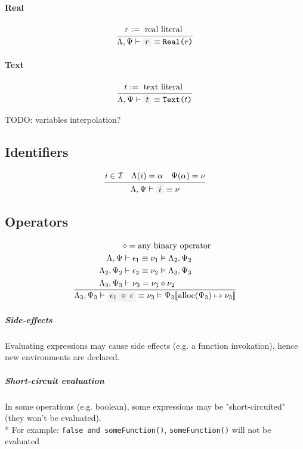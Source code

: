 \documentclass[11pt]{report}
\newcommand{\oprule}[3][gathered]{\frac{\begin{#1}#2\end{#1}}{\begin{gathered}#3\end{gathered}}}
\newcommand{\then}{\vdash}
\newcommand{\Then}{\vDash}
\newcommand{\code}[1]{\texttt{\colorbox{gray!10}{#1}}}
\newcommand{\bop}{\diamond}
\newcommand{\alloc}{\mathrm{alloc}}
\newcommand{\addr}{\alpha}
\newcommand{\expr}{\epsilon}
\newcommand{\val}{\nu}
\newcommand{\Id}{\mathcal{I}}
\newcommand{\env}[1]{[\![#1]\!]}
\newcommand{\EnvLoc}{\Lambda}
\newcommand{\EnvStore}{\Psi}
\theoremstyle{definition}
\newcommand{\comment}[1]{
	\parbox{0.9\linewidth}{\color{black!30}\small\sffamily #1}
}
\begin{document}
\paragraph{Real}

\[
	\oprule{
		r := \text{ real literal }
	}{
		\EnvLoc,\EnvStore\then \code{$r$} \equiv \texttt{Real($r$)}
	}
\]


\paragraph{Text}

\[
	\oprule{
		t := \text{ text literal }
	}{
		\EnvLoc,\EnvStore\then \code{$t$} \equiv \texttt{Text($t$)}
	}
\]

\comment{TODO: variables interpolation?}

\subsection{Identifiers}

\[
	\oprule{
		i \in \Id \quad \EnvLoc(i) = \addr \quad \EnvStore(\addr) = \val
	}{
		\EnvLoc,\EnvStore\then \code{$i$} \equiv \val
	}
\]

\subsection{Operators}

\[
	\oprule[aligned]{
		&\bop = \text{any binary operator} \\*
		\EnvLoc,\EnvStore     &\then \expr_1 \equiv \val_1 \Then \EnvLoc_2,\EnvStore_2 \\*
		\EnvLoc_2,\EnvStore_2 &\then \expr_2 \equiv \val_2 \Then \EnvLoc_3,\EnvStore_3 \\*
		\EnvLoc_3,\EnvStore_3 &\then \val_3 = \val_1 \bop \val_2 \\*
	}{
		\EnvLoc_3,\EnvStore_3\then \code{$\expr_1$ $\bop$ $\expr$} \equiv \val_3 \Then \EnvStore_3\env{\alloc(\EnvStore_3) \mapsto \val_3}
	}
\]

\subparagraph{Side-effects} Evaluating expressions may cause side effects (e.g.
a function invokation), hence new environments are declared.

\subparagraph{Short-circuit evaluation} In some operations (e.g. boolean), some
expressions may be "short-circuited" (they won't be evaluated).\\*
For example: \code{false and someFunction()}, \texttt{someFunction()} will not
be evaluated
\end{document}
